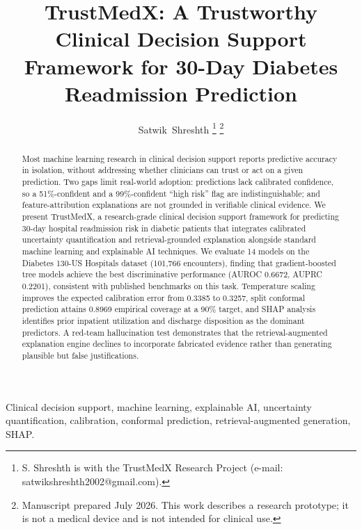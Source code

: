 \documentclass[12pt,onecolumn,journal]{IEEEtran}
\begin{document}
\title{TrustMedX: A Trustworthy Clinical Decision Support Framework for 30-Day Diabetes Readmission Prediction}

\author{Satwik~Shreshth%
\thanks{S. Shreshth is with the TrustMedX Research Project (e-mail: satwikshreshth2002@gmail.com).}%
\thanks{Manuscript prepared July 2026. This work describes a research prototype; it is not a medical device and is not intended for clinical use.}}


\maketitle

\begin{abstract}
Most machine learning research in clinical decision support reports predictive accuracy in isolation, without addressing whether clinicians can trust or act on a given prediction. Two gaps limit real-world adoption: predictions lack calibrated confidence, so a 51\%-confident and a 99\%-confident ``high risk'' flag are indistinguishable; and feature-attribution explanations are not grounded in verifiable clinical evidence. We present TrustMedX, a research-grade clinical decision support framework for predicting 30-day hospital readmission risk in diabetic patients that integrates calibrated uncertainty quantification and retrieval-grounded explanation alongside standard machine learning and explainable AI techniques. We evaluate 14 models on the Diabetes 130-US Hospitals dataset (101,766 encounters), finding that gradient-boosted tree models achieve the best discriminative performance (AUROC 0.6672, AUPRC 0.2201), consistent with published benchmarks on this task. Temperature scaling improves the expected calibration error from 0.3385 to 0.3257, split conformal prediction attains 0.8969 empirical coverage at a 90\% target, and SHAP analysis identifies prior inpatient utilization and discharge disposition as the dominant predictors. A red-team hallucination test demonstrates that the retrieval-augmented explanation engine declines to incorporate fabricated evidence rather than generating plausible but false justifications.
\end{abstract}

\begin{IEEEkeywords}
Clinical decision support, machine learning, explainable AI, uncertainty quantification, calibration, conformal prediction, retrieval-augmented generation, SHAP.
\end{IEEEkeywords}
\end{document}
